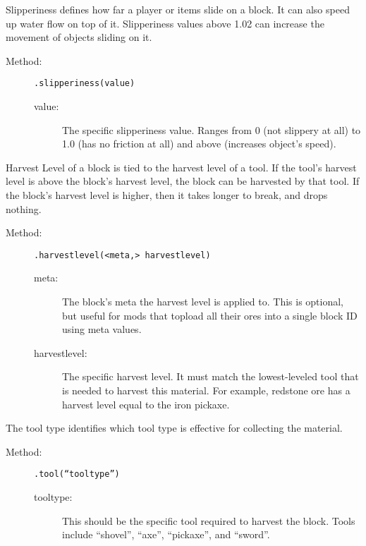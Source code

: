 \documentclass[letterpaper,titlepage,12pt]{article}
\begin{document}
Slipperiness defines how far a player or items slide on a block.  It can also speed up water flow on top of it.  Slipperiness values above 1.02 can increase the movement of objects sliding on it.

\begin{description}
\item[Method:] \texttt{.slipperiness(value)}
\begin{description}
\item [value:] The specific slipperiness value.  Ranges from 0 (not slippery at all) to 1.0 (has no friction at all) and above (increases object's speed).
\end{description}
\end{description}

Harvest Level of a block is tied to the harvest level of a tool.  If the tool's harvest level is above the block's harvest level, the block can be harvested by that tool.  If the block's harvest level is higher, then it takes longer to break, and drops nothing.

\begin{description}
\item[Method:] \texttt{.harvestlevel(<meta,> harvestlevel)}
\begin{description}
\item [meta:] The block's meta the harvest level is applied to.  This is optional, but useful for mods that topload all their ores into a single block ID using meta values.
\item [harvestlevel:] The specific harvest level.  It must match the lowest-leveled tool that is needed to harvest this material.  For example, redstone ore has a harvest level equal to the iron pickaxe.
\end{description}
\end{description}

The tool type identifies which tool type is effective for collecting the material. 

\begin{description}
\item[Method:] \texttt{.tool(``tooltype'')}
\begin{description}
\item [tooltype:] This should be the specific tool required to harvest the block.  Tools include ``shovel'', ``axe'', ``pickaxe'', and ``sword''.
\end{description}
\end{description}
\end{document}
